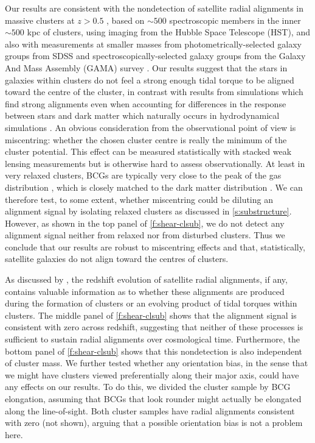 Our results are consistent with the nondetection of satellite radial alignments in massive clusters 
at $z>0.5$ \citep{hung12}, based on $\sim\!500$ spectroscopic members in the inner $\sim\!500$ kpc 
of clusters, using imaging from the Hubble Space Telescope (HST), and also with measurements at 
smaller masses from  photometrically-selected galaxy groups from SDSS \citep{hao11,chisari14} and 
spectroscopically-selected galaxy groups from the Galaxy And Mass Assembly (GAMA) survey 
\citep{schneider13}. Our results suggest that the stars in galaxies within clusters do not feel a 
strong enough tidal torque to be aligned toward the centre of the cluster, in contrast with results 
from simulations which find strong alignments even when accounting for differences in the response 
between stars and dark matter which naturally occurs in hydrodynamical simulations 
\citep[][Velliscig et al.\ in prep]{pereira10,tenneti14}. An obvious consideration from the 
observational point of view is miscentring: whether the chosen cluster centre is really the 
minimum of the cluster potential. This effect can be measured statistically with stacked weak 
lensing measurements \citep[e.g.,][]{george12} but is otherwise hard to assess observationally. At 
least in very relaxed clusters, BCGs are typically very close to the peak of the gas distribution 
\citep[e.g.,][]{lin04,mahdavi13}, which is closely matched to the dark matter distribution 
\citep{faltenbacher07_entropy}. We can therefore test, to some extent, whether miscentring could be 
diluting an alignment signal by isolating relaxed clusters as discussed in \cref{s:substructure}. 
However, as shown in the top panel of \cref{f:shear-clsub}, we do not detect any alignment signal 
neither from relaxed nor from disturbed clusters. Thus we conclude that our results are robust to 
miscentring effects and that, statistically, satellite galaxies do not align toward the centres of 
clusters.

As discussed by \cite{hao11}, the redshift evolution of satellite radial alignments, if any, 
contains valuable information as to whether these alignments are produced during the formation of 
clusters or an evolving product of tidal torques within clusters. The middle panel of 
\cref{f:shear-clsub} shows that the alignment signal is consistent with zero across redshift, 
suggesting that neither of these processes is sufficient to sustain radial alignments over 
cosmological time. Furthermore, the bottom panel of \cref{f:shear-clsub} shows that this 
nondetection is also independent of cluster mass. We further tested whether any orientation bias, 
in the sense that we might have clusters viewed preferentially along their major axis, could have 
any effects on our results. To do this, we divided the cluster sample by BCG elongation, assuming 
that BCGs that look rounder might actually be elongated along the line-of-sight. Both cluster 
samples have radial alignments consistent with zero (not shown), arguing that a possible 
orientation bias is not a problem here.


